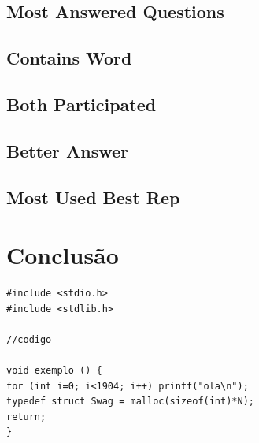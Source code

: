 \documentclass[a4paper, 11pt, oneside]{article}
\begin{document}
\subsection{Most Answered Questions}

\subsection{Contains Word}

\subsection{Both Participated}

\subsection{Better Answer}

\subsection{Most Used Best Rep}

\newpage
\section{Conclusão}

\begin{lstlisting}[caption= exemplo código]
#include <stdio.h>
#include <stdlib.h>

//codigo

void exemplo () {
for (int i=0; i<1904; i++) printf("ola\n");
typedef struct Swag = malloc(sizeof(int)*N);
return;
}
\end{lstlisting}
\end{document}
